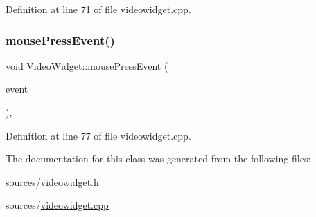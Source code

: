 Definition at line 71 of file videowidget.\+cpp.

\mbox{\label{class_video_widget_a2ad2fa38f5cf82938f50eaba9ddc6173}} 
\subsubsection{\texorpdfstring{mouse\+Press\+Event()}{mousePressEvent()}}
{\footnotesize\ttfamily void Video\+Widget\+::mouse\+Press\+Event (\begin{DoxyParamCaption}\item[{Q\+Mouse\+Event $\ast$}]{event }\end{DoxyParamCaption})\hspace{0.3cm}{\ttfamily [override]}, {\ttfamily [protected]}}



Definition at line 77 of file videowidget.\+cpp.



The documentation for this class was generated from the following files\+:\begin{DoxyCompactItemize}
\item 
sources/\mbox{\hyperlink{videowidget_8h}{videowidget.\+h}}\item 
sources/\mbox{\hyperlink{videowidget_8cpp}{videowidget.\+cpp}}\end{DoxyCompactItemize}
